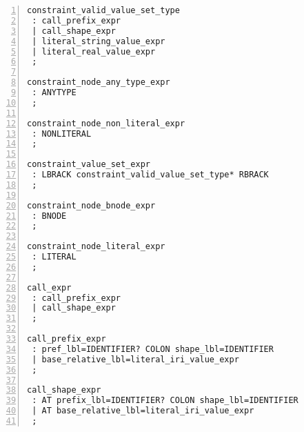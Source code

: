 \begin{lstlisting}[numbers=left,basicstyle=\ttfamily\scriptsize]
constraint_valid_value_set_type
 : call_prefix_expr
 | call_shape_expr
 | literal_string_value_expr
 | literal_real_value_expr
 ;

constraint_node_any_type_expr
 : ANYTYPE
 ;

constraint_node_non_literal_expr
 : NONLITERAL
 ;

constraint_value_set_expr
 : LBRACK constraint_valid_value_set_type* RBRACK
 ;

constraint_node_bnode_expr
 : BNODE
 ;

constraint_node_literal_expr
 : LITERAL
 ;

call_expr
 : call_prefix_expr
 | call_shape_expr
 ;

call_prefix_expr
 : pref_lbl=IDENTIFIER? COLON shape_lbl=IDENTIFIER
 | base_relative_lbl=literal_iri_value_expr
 ;

call_shape_expr
 : AT prefix_lbl=IDENTIFIER? COLON shape_lbl=IDENTIFIER
 | AT base_relative_lbl=literal_iri_value_expr
 ;
\end{lstlisting}